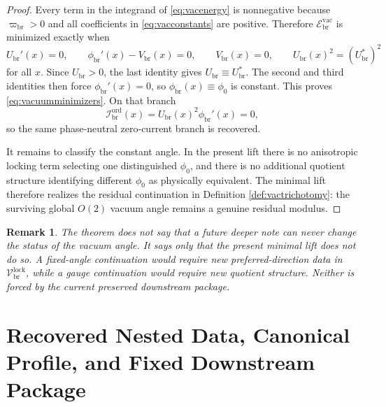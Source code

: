 \documentclass[11pt]{article}
\newcommand{\ProfWeight}{\varpi_{\mathrm{br}}}
\newcommand{\RespOrderCurrent}{\mathcal I_{\mathrm{br}}^{\mathrm{ord}}}
\newcommand{\RespVacAmp}{U_{\mathrm{br}}}
\newcommand{\RespVacEq}{U_{\mathrm{br}}^{\ast}}
\newcommand{\RespVacPhase}{\phi_{\mathrm{br}}}
\newcommand{\RespVacCarrier}{V_{\mathrm{br}}}
\newcommand{\RespVacEnergy}{\mathscr E_{\mathrm{br}}^{\mathrm{vac}}}
\newcommand{\RespVacLock}{\mathscr V_{\mathrm{br}}^{\mathrm{lock}}}
\newtheorem{remark}{Remark}
\begin{document}
\begin{proof}
Every term in the integrand of \eqref{eq:vacenergy} is nonnegative because \(\ProfWeight>0\) and all coefficients in \eqref{eq:vacconstants} are positive. Therefore \(\RespVacEnergy\) is minimized exactly when
\[
\RespVacAmp'(x)=0,
\qquad
\RespVacPhase'(x)-\RespVacCarrier(x)=0,
\qquad
\RespVacCarrier(x)=0,
\qquad
\RespVacAmp(x)^2=(\RespVacEq)^2
\]
for all \(x\). Since \(\RespVacAmp>0\), the last identity gives \(\RespVacAmp\equiv\RespVacEq\). The second and third identities then force \(\RespVacPhase'(x)=0\), so \(\RespVacPhase(x)\equiv\phi_0\) is constant. This proves \eqref{eq:vacuumminimizers}. On that branch
\[
\RespOrderCurrent(x)=\RespVacAmp(x)^2\RespVacPhase'(x)=0,
\]
so the same phase-neutral zero-current branch is recovered.

It remains to classify the constant angle. In the present lift there is no anisotropic locking term selecting one distinguished \(\phi_0\), and there is no additional quotient structure identifying different \(\phi_0\) as physically equivalent. The minimal lift therefore realizes the residual continuation in Definition \ref{def:vactrichotomy}: the surviving global \(O(2)\) vacuum angle remains a genuine residual modulus.
\end{proof}

\begin{remark}
The theorem does not say that a future deeper note can never change the status of the vacuum angle. It says only that the present minimal lift does not do so. A fixed-angle continuation would require new preferred-direction data in \(\RespVacLock\), while a gauge continuation would require new quotient structure. Neither is forced by the current preserved downstream package.
\end{remark}

\section{Recovered Nested Data, Canonical Profile, and Fixed Downstream Package}
\end{document}
